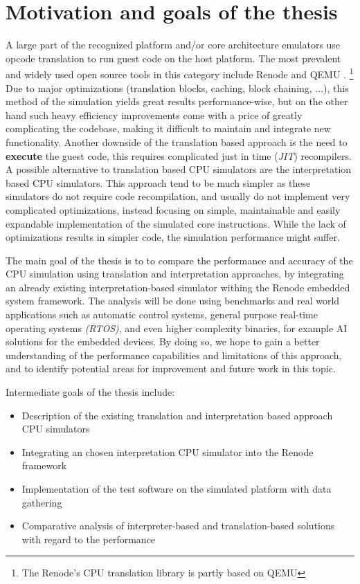 \section{Motivation and goals of the thesis}

A large part of the recognized platform and/or core architecture emulators use opcode translation to run guest code
on the host platform. The most prevalent and widely used open source tools in this category include Renode \cite{Renode}
and QEMU \cite{Qemu}.%
\footnote{The Renode's CPU translation library is partly based on QEMU}
Due to major optimizations (translation blocks, caching, block chaining, ...), this method of the simulation yields
great results performance-wise, but on the other hand such heavy efficiency improvements come with a price of greatly 
complicating the codebase, making it difficult to maintain and integrate new functionality. Another downside of the
translation based approach is the need to \textbf{execute} the guest code, this requires complicated just in
time (\textit{JIT}) recompilers. A possible alternative to translation based CPU simulators are the interpretation
based CPU simulators. This approach tend to be much simpler as these simulators do not require code recompilation,
and usually do not implement very complicated optimizations, instead focusing on simple, maintainable and easily
expandable implementation of the simulated core instructions. While the lack of optimizations results in simpler
code, the simulation performance might suffer.

The main goal of the thesis is to to compare the performance and accuracy of the CPU simulation using translation
and interpretation approaches, by integrating an already existing interpretation-based simulator withing the Renode
embedded system framework. The analysis will be done using benchmarks and real world applications such as automatic control
systems, general purpose real-time operating systems \textit{(RTOS)}, and even higher complexity binaries, for example AI solutions for the embedded devices.
By doing so, we hope to gain a better understanding of the performance capabilities and limitations of this approach,
and to identify potential areas for improvement and future work in this topic.

\noindent Intermediate goals of the thesis include:
\begin{itemize}
	\item{Description of the existing translation and interpretation based approach CPU simulators}
	\item{Integrating an chosen interpretation CPU simulator into the Renode framework}
	\item{Implementation of the test software on the simulated platform with data gathering}
	\item{Comparative analysis of interpreter-based and translation-based solutions with regard to the performance}
\end{itemize}

